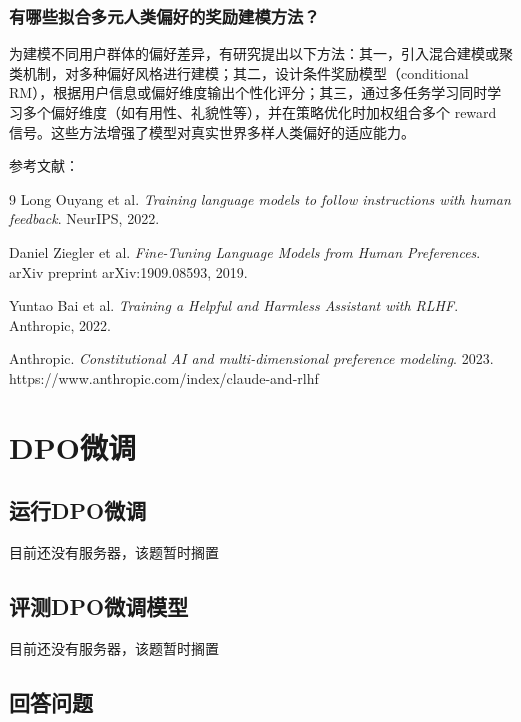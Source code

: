 \documentclass{article}
\begin{document}
\subsubsection{有哪些拟合多元人类偏好的奖励建模方法？}

为建模不同用户群体的偏好差异，有研究提出以下方法：其一，引入混合建模或聚类机制，对多种偏好风格进行建模；其二，设计条件奖励模型（conditional RM），根据用户信息或偏好维度输出个性化评分；其三，通过多任务学习同时学习多个偏好维度（如有用性、礼貌性等）\cite{anthropic2023claude}，并在策略优化时加权组合多个 reward 信号。这些方法增强了模型对真实世界多样人类偏好的适应能力。

\vspace{1em}

\noindent
参考文献：

\begin{thebibliography}{9}
Long Ouyang et al. \emph{Training language models to follow instructions with human feedback}. NeurIPS, 2022.

Daniel Ziegler et al. \emph{Fine-Tuning Language Models from Human Preferences}. arXiv preprint arXiv:1909.08593, 2019.

Yuntao Bai et al. \emph{Training a Helpful and Harmless Assistant with RLHF}. Anthropic, 2022.

Anthropic. \emph{Constitutional AI and multi-dimensional preference modeling}. 2023. https://www.anthropic.com/index/claude-and-rlhf
\end{thebibliography}


\section{DPO微调}
\subsection{运行DPO微调}
目前还没有服务器，该题暂时搁置

\subsection{评测DPO微调模型}
目前还没有服务器，该题暂时搁置

\subsection{回答问题}
\end{document}
